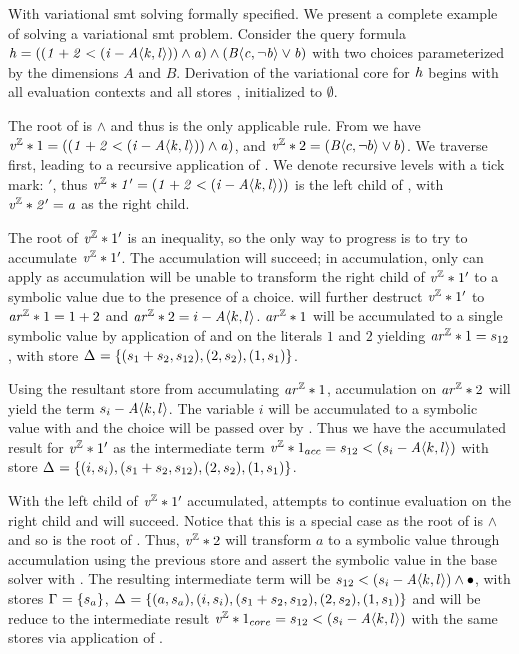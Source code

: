 \label{section:vsmt:example}
%
With variational \ac{smt} solving formally specified. We present a complete
example of solving a variational \ac{smt} problem. Consider the query formula
\newline$\kf{\hV = ((1 + 2 < (i - \chc[A]{k,l})) \wedge a) \wedge
  (\chc[B]{c,\neg b} \vee b)}$ with two choices parameterized by the dimensions
$A$ and $B$. Derivation of the variational core for $\mathit{h}$ begins with all
evaluation contexts and all stores \aStore{}, \eStore{} initialized to
$\emptyset$.

The root of \hV{} is $\wedge$ and thus \evAnd{} is the only applicable rule.
From \evAnd{} we have $\eIL*{1} = \kf{((1 + 2 < (i - \chc[A]{k,l})) \wedge a)}$,
and $\eIL*{2} = (\chc[B]{c,\neg b} \vee b)$. We traverse  first, leading
to a recursive application of \evAnd{}. We denote recursive levels with a tick
mark: $'$, thus $\kf{\eIL*{1}' = (1 + 2 < (i - \chc[A]{k,l}))}$ is the left
child of , with $\mathit{\mathit{v^{\mathbb{Z}}}*{2}' = a}$ as the right child.

The root of $\mathit{v^{\mathbb{Z}}}*{1}'$ is an inequality, so the only way to progress is to try
to accumulate $\mathit{v^{\mathbb{Z}}}*{1}'$. The accumulation will succeed; in accumulation, only
\acInEqV{} can apply as accumulation will be unable to transform the right child
of $\mathit{v^{\mathbb{Z}}}*{1}'$ to a symbolic value due to the presence of a choice. \acInEqV{}
will further destruct $\mathit{v^{\mathbb{Z}}}*{1}'$ to $\mathit{ar^{\mathbb{Z}}}*{1} = 1 + 2$ and $\eAR*{2} = i -
\chc[A]{k,l}$. $\mathit{ar^{\mathbb{Z}}}*{1}$ will be accumulated to a single symbolic value by
application of \acArithS{} and \acRef{} on the literals $1$ and $2$ yielding
$\mathit{ar^{\mathbb{Z}}}*{1} = s_{12}$, with store $\aStore{}=\set{(s_{1} + s_{2}, s_{12}),
  (2,s_{2}), (1,s_{1})}$.

Using the resultant store from accumulating $\mathit{ar^{\mathbb{Z}}}*{1}$, accumulation on
$\mathit{ar^{\mathbb{Z}}}*{2}$ will yield the term $s_{i} - \chc[A]{k,l}$. The variable $i$ will be
accumulated to a symbolic value with \acRef{} and the choice will be passed over
by \acChc{}. Thus we have the accumulated result for $\mathit{v^{\mathbb{Z}}}*{1}'$ as the
intermediate term $\eIL*{1}_{acc} = s_{12} < (s_{i} - \chc[A]{k,l})$ with store
$\aStore{}=\set{(i, s_{i}),(s_{1} + s_{2}, s_{12}), (2,s_{2}), (1,s_{1})}$.

With the left child of $\mathit{v^{\mathbb{Z}}}*{1}'$ accumulated, \evAnd{} attempts to continue
evaluation on the right child and will succeed. Notice that this is a special
case as the root of  is $\wedge$ and so is the root of \hV{}. Thus,
$\mathit{v^{\mathbb{Z}}}*{2}$ will transform $a$ to a symbolic value through accumulation using the
previous store and assert the symbolic value in the base solver with \evSym{}.
The resulting intermediate term will be $s_{12} < (s_{i} - \chc[A]{k,l}) \wedge
\unit{}$, with stores $\eStore{}=\set{s_{a}}$, $\aStore{}=\set{(a,s_{a}),(i,
  s_{i}),(s_{1} + s_{2}, s_{12}), (2,s_{2}), (1,s_{1})}$ and will be reduce to
the intermediate result $\eIL*{1}_{core} = s_{12} < (s_{i} - \chc[A]{k,l})$ with
the same stores via application of \evAndR{}.

